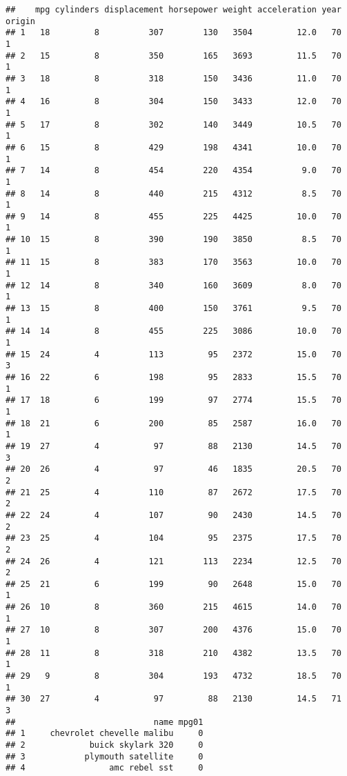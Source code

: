 \documentclass[]{article}
\begin{document}
\begin{verbatim}
##    mpg cylinders displacement horsepower weight acceleration year origin
## 1   18         8          307        130   3504         12.0   70      1
## 2   15         8          350        165   3693         11.5   70      1
## 3   18         8          318        150   3436         11.0   70      1
## 4   16         8          304        150   3433         12.0   70      1
## 5   17         8          302        140   3449         10.5   70      1
## 6   15         8          429        198   4341         10.0   70      1
## 7   14         8          454        220   4354          9.0   70      1
## 8   14         8          440        215   4312          8.5   70      1
## 9   14         8          455        225   4425         10.0   70      1
## 10  15         8          390        190   3850          8.5   70      1
## 11  15         8          383        170   3563         10.0   70      1
## 12  14         8          340        160   3609          8.0   70      1
## 13  15         8          400        150   3761          9.5   70      1
## 14  14         8          455        225   3086         10.0   70      1
## 15  24         4          113         95   2372         15.0   70      3
## 16  22         6          198         95   2833         15.5   70      1
## 17  18         6          199         97   2774         15.5   70      1
## 18  21         6          200         85   2587         16.0   70      1
## 19  27         4           97         88   2130         14.5   70      3
## 20  26         4           97         46   1835         20.5   70      2
## 21  25         4          110         87   2672         17.5   70      2
## 22  24         4          107         90   2430         14.5   70      2
## 23  25         4          104         95   2375         17.5   70      2
## 24  26         4          121        113   2234         12.5   70      2
## 25  21         6          199         90   2648         15.0   70      1
## 26  10         8          360        215   4615         14.0   70      1
## 27  10         8          307        200   4376         15.0   70      1
## 28  11         8          318        210   4382         13.5   70      1
## 29   9         8          304        193   4732         18.5   70      1
## 30  27         4           97         88   2130         14.5   71      3
##                            name mpg01
## 1     chevrolet chevelle malibu     0
## 2             buick skylark 320     0
## 3            plymouth satellite     0
## 4                 amc rebel sst     0

\end{verbatim}
\end{document}
